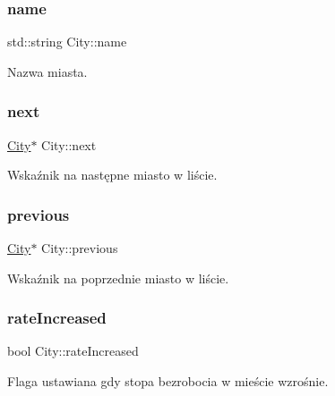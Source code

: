 \subsubsection{\texorpdfstring{name}{name}}
{\footnotesize\ttfamily std\+::string City\+::name}



Nazwa miasta. 

\mbox{\label{struct_city_a4d954b2bf73bf0532a8b78ad760622b1}} 
\subsubsection{\texorpdfstring{next}{next}}
{\footnotesize\ttfamily \mbox{\hyperlink{struct_city}{City}}$\ast$ City\+::next}



Wskaźnik na następne miasto w liście. 

\mbox{\label{struct_city_a6cd07e161d5a616619176d3ace51ed5d}} 
\subsubsection{\texorpdfstring{previous}{previous}}
{\footnotesize\ttfamily \mbox{\hyperlink{struct_city}{City}}$\ast$ City\+::previous}



Wskaźnik na poprzednie miasto w liście. 

\mbox{\label{struct_city_aa5d51ba1e563c1e7d44e977f8a12fa6e}} 
\subsubsection{\texorpdfstring{rateIncreased}{rateIncreased}}
{\footnotesize\ttfamily bool City\+::rate\+Increased}



Flaga ustawiana gdy stopa bezrobocia w mieście wzrośnie. 

\mbox{\label{struct_city_ac6c7ff9b807ec1fd8ed680ec16f90c57}} 
